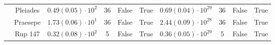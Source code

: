 \begin{tabular}{lccccccccr}
          & Pleiades &    $0.49\left(0.05\right)\cdot 10^{2}$ &             36 &           False &            True &        $0.69\left(0.04\right)\cdot 10^{29}$ &               36 &             False &              True \\
          & Praesepe &    $1.73\left(0.06\right)\cdot 10^{1}$ &             36 &           False &            True &        $2.44\left(0.09\right)\cdot 10^{28}$ &               36 &             False &              True \\
          & Rup 147 &    $0.32\left(0.08\right)\cdot 10^{2}$ &              5 &           False &            True &        $0.36\left(0.05\right)\cdot 10^{29}$ &                5 &             False &              True \\
\hline

\end{tabular}
